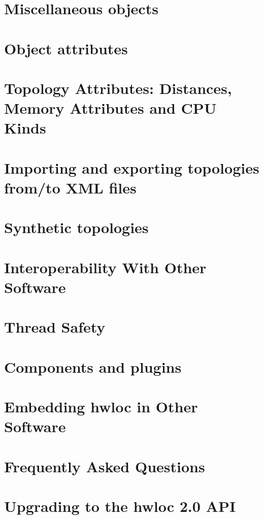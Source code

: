 \documentclass[twoside]{book}
\newcommand{\+}{\discretionary{\mbox{\scriptsize$\hookleftarrow$}}{}{}}
\begin{document}
\chapter{Miscellaneous objects}
\label{a00385}

\chapter{Object attributes}
\label{a00386}

\chapter{Topology Attributes\+: Distances, Memory Attributes and C\+PU Kinds}
\label{a00387}

\chapter{Importing and exporting topologies from/to X\+ML files}
\label{a00388}

\chapter{Synthetic topologies}
\label{a00389}

\chapter{Interoperability With Other Software}
\label{a00390}

\chapter{Thread Safety}
\label{a00391}

\chapter{Components and plugins}
\label{a00392}

\chapter{Embedding hwloc in Other Software}
\label{a00393}

\chapter{Frequently Asked Questions}
\label{a00394}

\chapter{Upgrading to the hwloc 2.0 A\+PI}
\label{a00395}

\end{document}

